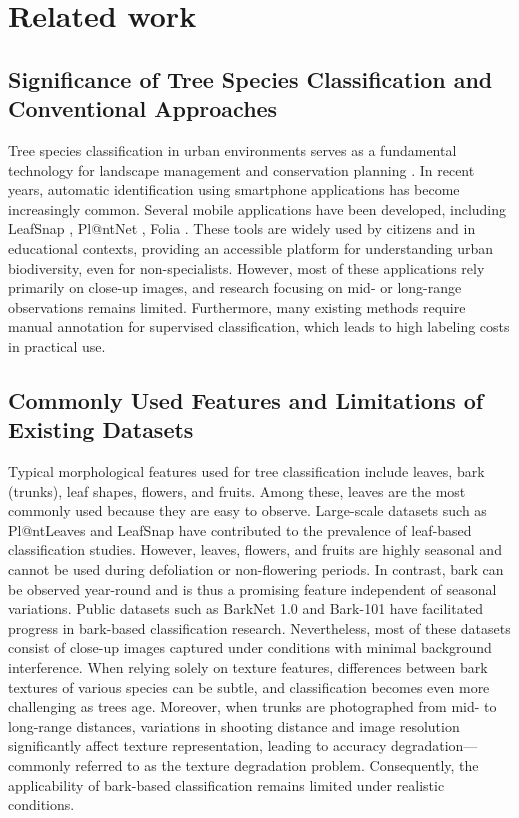 \section{Related work}

\subsection{Significance of Tree Species Classification and Conventional Approaches}
Tree species classification in urban environments serves as a fundamental technology for landscape management and conservation planning \cite{ref4}. In recent years, automatic identification using smartphone applications has become increasingly common. Several mobile applications have been developed, including LeafSnap \cite{ref5} , Pl@ntNet \cite{ref6} , Folia \cite{ref7}. These tools are widely used by citizens and in educational contexts, providing an accessible platform for understanding urban biodiversity, even for non-specialists. However, most of these applications rely primarily on close-up images, and research focusing on mid- or long-range observations remains limited. Furthermore, many existing methods require manual annotation for supervised classification, which leads to high labeling costs in practical use. 

\subsection{Commonly Used Features and Limitations of Existing Datasets}
Typical morphological features used for tree classification include leaves, bark (trunks), leaf shapes, flowers, and fruits. Among these, leaves are the most commonly used because they are easy to observe. Large-scale datasets such as Pl@ntLeaves \cite{ref8} and LeafSnap \cite{ref5} have contributed to the prevalence of leaf-based classification studies. However, leaves, flowers, and fruits are highly seasonal and cannot be used during defoliation or non-flowering periods. In contrast, bark can be observed year-round and is thus a promising feature independent of seasonal variations. Public datasets such as BarkNet 1.0 \cite{ref9} and Bark-101 \cite{ref10} have facilitated progress in bark-based classification research. Nevertheless, most of these datasets consist of close-up images captured under conditions with minimal background interference. When relying solely on texture features, differences between bark textures of various species can be subtle, and classification becomes even more challenging as trees age. Moreover, when trunks are photographed from mid- to long-range distances, variations in shooting distance and image resolution significantly affect texture representation, leading to accuracy degradation—commonly referred to as the texture degradation problem. Consequently, the applicability of bark-based classification remains limited under realistic conditions.

